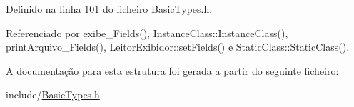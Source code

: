 Definido na linha 101 do ficheiro Basic\+Types.\+h.



Referenciado por exibe\+\_\+\+Fields(), Instance\+Class\+::\+Instance\+Class(), print\+Arquivo\+\_\+\+Fields(), Leitor\+Exibidor\+::set\+Fields() e Static\+Class\+::\+Static\+Class().



A documentação para esta estrutura foi gerada a partir do seguinte ficheiro\+:\begin{DoxyCompactItemize}
\item 
include/\hyperlink{BasicTypes_8h}{Basic\+Types.\+h}\end{DoxyCompactItemize}
